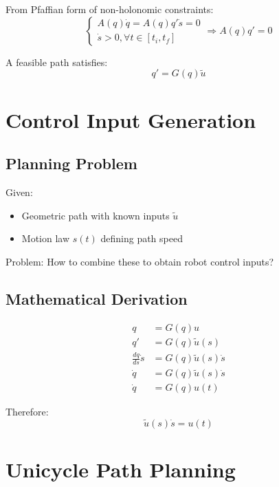\documentclass[openany]{book}
\theoremstyle{definition}
\theoremstyle{remark}
\begin{document}
From Pfaffian form of non-holonomic constraints:
\begin{equation}
    \begin{cases}
        A(q)\dot{q} = A(q)q'\dot{s} = 0 \\
        \dot{s} > 0, \forall t \in [t_i, t_f]
    \end{cases}
    \Rightarrow A(q)q' = 0
\end{equation}

A feasible path satisfies:
\begin{equation}
    q' = G(q)\tilde{u}
\end{equation}

\section{Control Input Generation}

\subsection{Planning Problem}
Given:
\begin{itemize}
    \item Geometric path with known inputs $\tilde{u}$
    \item Motion law $s(t)$ defining path speed
\end{itemize}

Problem: How to combine these to obtain robot control inputs?

\subsection{Mathematical Derivation}
\begin{equation}
    \begin{aligned}
        q &= G(q)u \\
        q' &= G(q)\tilde{u}(s) \\
        \frac{dq}{ds}\dot{s} &= G(q)\tilde{u}(s)\dot{s} \\
        \dot{q} &= G(q)\tilde{u}(s)\dot{s} \\
        \dot{q} &= G(q)u(t)
    \end{aligned}
\end{equation}

Therefore:
\begin{equation}
    \tilde{u}(s)\dot{s} = u(t)
\end{equation}

\section{Unicycle Path Planning}
\end{document}
